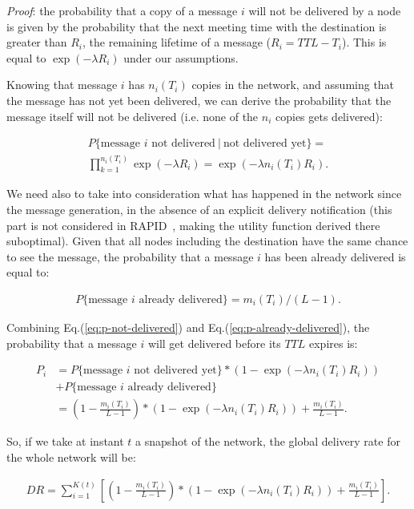 \emph{Proof}: the probability that a copy of a message $i$ will not be delivered by a node is given by the probability that the next meeting time with the destination is greater than $R_i$, the remaining lifetime of a message ($R_{i} = TTL - T_{i}$). This is equal to $\exp(-\lambda{R_i})$ under our assumptions.

Knowing that message $i$ has $n_i(T_i)$ copies in the network, and assuming that the message has not yet been delivered, we can derive the probability that the message itself will not be delivered (i.e. none of the $n_{i}$ copies gets delivered):

\begin{eqnarray}
P\{\mbox{message\ $i$ not\ delivered}\ |\ \mbox{not\ delivered\ yet}  \}= \nonumber \\
\prod_{k=1}^{n_i(T_i)}\exp(-\lambda R_i ) = \exp(-\lambda n_i(T_i) R_i).
\label{eq:p-not-delivered}
\end{eqnarray}

We need also to take into consideration what has happened in the network since the message generation, in the absence of an explicit delivery notification (this part is not considered in RAPID~\cite{Levine:Sigcomm07}, making the utility function derived there suboptimal). Given that all nodes including the destination have the same chance to see the message, the probability that a message $i$ has been already delivered is equal to:

\begin{align}
P \{ \mbox{message\ $i$ already\ delivered} \} = m_i(T_i) / (L-1).
\label{eq:p-already-delivered}
\end{align}

Combining Eq.(\ref{eq:p-not-delivered}) and Eq.(\ref{eq:p-already-delivered}), the probability that a message $i$ will get delivered before its $TTL$ expires is:

\begin{align*}
P_i & =  P \{ \mbox{message\ $i$ not\ delivered\ yet} \} *  (1 -\exp(-\lambda n_i(T_i) R_i)) \\
& +  P \{ \mbox{message\ $i$ already delivered} \} \\
& =  (1 - \frac{m_i(T_i)}{L-1})*(1 - \exp(-\lambda n_i(T_i) R_i ))+\frac{m_i(T_i)}{L-1}.
\end{align*}
\normalsize

So, if we take at instant $t$ a snapshot of the network, the global delivery rate for the whole network will be:

\begin{align*} DR =\sum_{i=1}^{K(t)}\left[(1 - \frac{m_i(T_i)}{L-1})*(1 -\exp(-\lambda n_i(T_i)  R_i )) +\frac{m_i(T_i)}{L-1}\right].
\end{align*}
\normalsize


